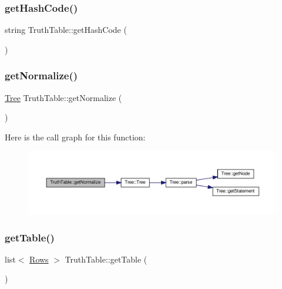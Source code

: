 \subsubsection{\texorpdfstring{get\+Hash\+Code()}{getHashCode()}}
{\footnotesize\ttfamily string Truth\+Table\+::get\+Hash\+Code (\begin{DoxyParamCaption}{ }\end{DoxyParamCaption})}

\mbox{\label{class_truth_table_a9dcb8d74d39ebc1a8ada938f1ccbce97}} 
\subsubsection{\texorpdfstring{get\+Normalize()}{getNormalize()}}
{\footnotesize\ttfamily \hyperlink{class_tree}{Tree} Truth\+Table\+::get\+Normalize (\begin{DoxyParamCaption}{ }\end{DoxyParamCaption})}

Here is the call graph for this function\+:\nopagebreak
\begin{figure}[H]
\begin{center}
\leavevmode
\includegraphics[width=350pt]{dc/d49/class_truth_table_a9dcb8d74d39ebc1a8ada938f1ccbce97_cgraph}
\end{center}
\end{figure}
\mbox{\label{class_truth_table_a3683cdc11d4f4735e449aa82c8095357}} 
\subsubsection{\texorpdfstring{get\+Table()}{getTable()}}
{\footnotesize\ttfamily list$<$ \hyperlink{class_rows}{Rows} $>$ Truth\+Table\+::get\+Table (\begin{DoxyParamCaption}{ }\end{DoxyParamCaption})}



